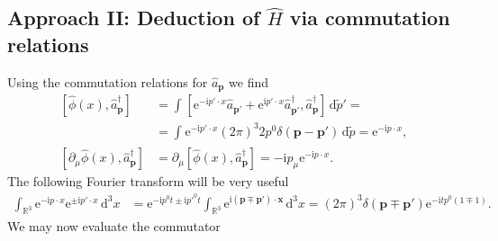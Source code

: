 \documentclass[english, parskip=full]{scrartcl}
\newcommand{\intx}{}
\newcommand{\intr}{}
\newcommand{\kla}{}
\newcommand{\klam}{}
\renewcommand{\i}{\text{i}}
\newcommand{\e}{\text{e}}
\begin{document}
\subsection*{Approach II: Deduction of $\hat{H}$ via commutation relations}
Using the commutation relations for $\hat{a}_\textbf{p}$ we find
\begin{align}
\klam\left[ \hat{\phi}(x), \hat{a}_\textbf{p}^\dagger \right] &= \intx\int_{ }^{ } \klam\left[ \e^{-\i p'\cdot x} \hat{a}_{\textbf{p}'} + \e^{\i p'\cdot x} \hat{a}_{\textbf{p}'}^\dagger, \hat{a}_\textbf{p}^\dagger \right] \, \mathrm{d}\tilde{p}' = \\
&= \intx\int_{ }^{ } \e^{-\i p'\cdot x} (2\pi)^3 2p^0 \delta(\textbf{p} - \textbf{p}') \, \mathrm{d}\tilde{p} = \e^{-\i p\cdot x},\\
\klam\left[ \partial_\mu \hat{\phi}(x), \hat{a}_\textbf{p}^\dagger \right] &= \partial_\mu \left[ \hat{\phi}(x), \hat{a}_\textbf{p}^\dagger \right] = -\i p_\mu \e^{-\i p\cdot x}.
\end{align}
The following Fourier transform will be very useful
\begin{align}
\intr\int_{\mathbb{R}^{3}} \e^{-\i p\cdot x} \e^{\pm\i p'\cdot x} \, \mathrm{d}^{3}x &= \e^{-\i p^0t \pm \i p'^0 t} \intr\int_{\mathbb{R}^{3}} \e^{\i (\textbf{p} \mp \textbf{p}')\cdot \textbf{x}} \, \mathrm{d}^{3}x = (2\pi)^3 \delta \kla\left( \textbf{p} \mp \textbf{p}' \right) \e^{-\i t p^0 (1 \mp 1)}.
\end{align}
We may now evaluate the commutator
\end{document}
